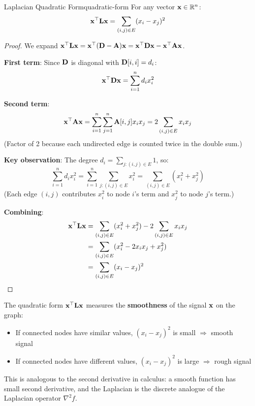 \begin{notechapter}
\begin{theorem}{Laplacian Quadratic Form}{quadratic-form}
For any vector $\mathbf{x} \in \mathbb{R}^n$:
\begin{equation}
\mathbf{x}^\top \mathbf{L} \mathbf{x} = \sum_{(i,j) \in E} (x_i - x_j)^2
\label{graph-laplacians:eq:quadratic-form}
\end{equation}
\end{theorem}

\begin{proof}
We expand $\mathbf{x}^\top \mathbf{L} \mathbf{x} = \mathbf{x}^\top (\mathbf{D} - \mathbf{A}) \mathbf{x} = \mathbf{x}^\top \mathbf{D} \mathbf{x} - \mathbf{x}^\top \mathbf{A} \mathbf{x}$.

\textbf{First term}: Since $\mathbf{D}$ is diagonal with $\mathbf{D}[i,i] = d_i$:
\[
\mathbf{x}^\top \mathbf{D} \mathbf{x} = \sum_{i=1}^{n} d_i x_i^2
\]

\textbf{Second term}: 
\[
\mathbf{x}^\top \mathbf{A} \mathbf{x} = \sum_{i=1}^{n} \sum_{j=1}^{n} \mathbf{A}[i,j] x_i x_j = 2 \sum_{(i,j) \in E} x_i x_j
\]
(Factor of 2 because each undirected edge is counted twice in the double sum.)

\textbf{Key observation}: The degree $d_i = \sum_{j: (i,j) \in E} 1$, so:
\[
\sum_{i=1}^{n} d_i x_i^2 = \sum_{i=1}^{n} \sum_{j: (i,j) \in E} x_i^2 = \sum_{(i,j) \in E} (x_i^2 + x_j^2)
\]
(Each edge $(i,j)$ contributes $x_i^2$ to node $i$'s term and $x_j^2$ to node $j$'s term.)

\textbf{Combining}:
\begin{align}
\mathbf{x}^\top \mathbf{L} \mathbf{x} &= \sum_{(i,j) \in E} (x_i^2 + x_j^2) - 2\sum_{(i,j) \in E} x_i x_j \\
&= \sum_{(i,j) \in E} (x_i^2 - 2x_i x_j + x_j^2) \\
&= \sum_{(i,j) \in E} (x_i - x_j)^2 \qedhere
\end{align}
\end{proof}

\begin{intuition}
The quadratic form $\mathbf{x}^\top \mathbf{L} \mathbf{x}$ measures the \textbf{smoothness} of the signal $\mathbf{x}$ on the graph:
\begin{itemize}
    \item If connected nodes have similar values, $(x_i - x_j)^2$ is small $\Rightarrow$ smooth signal
    \item If connected nodes have different values, $(x_i - x_j)^2$ is large $\Rightarrow$ rough signal
\end{itemize}

This is analogous to the second derivative in calculus: a smooth function has small second derivative, and the Laplacian is the discrete analogue of the Laplacian operator $\nabla^2 f$.
\end{intuition}


\end{notechapter}
